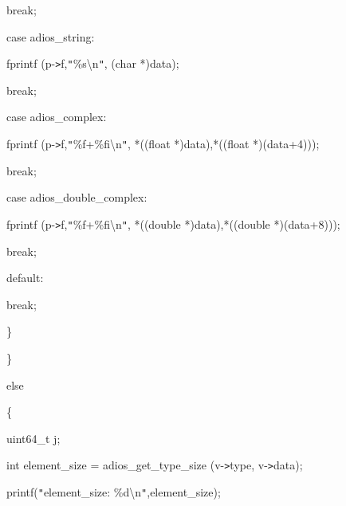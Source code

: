 \vspace{10pt}
\parindent=57pt
break;

\vspace{10pt}
\parindent=43pt
case adios\_string:

\vspace{10pt}
\parindent=57pt
fprintf (p-\texttt{>}f,\texttt{"}\%s\textbackslash{}n\texttt{"}, (char *)data); 

\vspace{10pt}
break;

\vspace{10pt}
\parindent=100pt
case adios\_complex:

\vspace{10pt}
\parindent=57pt
fprintf (p-\texttt{>}f,\texttt{"}\%f+\%fi\textbackslash{}n\texttt{"}, *((float 
*)data),*((float *)(data+4))); 

\vspace{10pt}
break;

\vspace{10pt}
\parindent=100pt
case adios\_double\_complex:

\vspace{10pt}
\parindent=57pt
fprintf (p-\texttt{>}f,\texttt{"}\%f+\%fi\textbackslash{}n\texttt{"}, *((double 
*)data),*((double *)(data+8))); 

\vspace{10pt}
break;

\vspace{10pt}
\parindent=3pt
default:

\vspace{10pt}
\parindent=57pt
break;

\vspace{10pt}
\parindent=18pt
\}

\vspace{10pt}
\parindent=14pt
\} 

\vspace{10pt}
else

\vspace{10pt}
\parindent=28pt
\{

\vspace{10pt}
uint64\_t j;

\vspace{10pt}
\parindent=57pt
int element\_size = adios\_get\_type\_size (v-\texttt{>}type, v-\texttt{>}data);

\vspace{10pt}
\parindent=28pt
printf(\texttt{"}element\_size: \%d\textbackslash{}n\texttt{"},element\_size);

